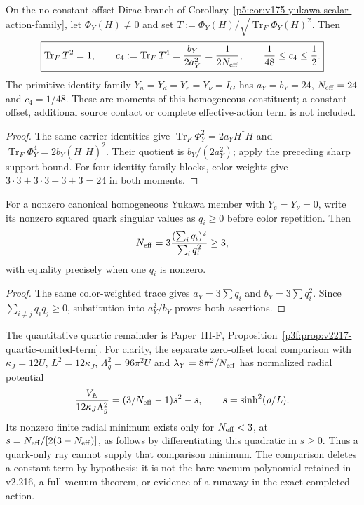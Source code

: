 \documentclass[12pt,a4paper]{article}
\begin{document}
\begin{corollary}
\label{p5:cor:v2211-yukawa-ray-moment}
On the no-constant-offset Dirac branch of
Corollary~\ref{p5:cor:v175-yukawa-scalar-action-family}, let
\(\Phi_Y(H)\ne0\) and set
\(T:=\Phi_Y(H)/\sqrt{\operatorname{Tr}_F\Phi_Y(H)^2}\).
Then
\[
 \boxed{\operatorname{Tr}_FT^2=1,\qquad
 c_4:=\operatorname{Tr}_FT^4
 =\frac{b_Y}{2a_Y^2}=\frac1{2N_{\rm eff}},\qquad
 \frac1{48}\le c_4\le\frac12.}
\]
The primitive identity family \(Y_u=Y_d=Y_e=Y_\nu=I_G\) has
\(a_Y=b_Y=24\), \(N_{\rm eff}=24\) and \(c_4=1/48\).
These are moments of this homogeneous constituent; a constant offset,
additional source contact or complete effective-action term is not included.
\end{corollary}
\begin{proof}
The same-carrier identities give
\(\operatorname{Tr}_F\Phi_Y^2=2a_YH^\dagger H\) and
\(\operatorname{Tr}_F\Phi_Y^4=2b_Y(H^\dagger H)^2\).
Their quotient is \(b_Y/(2a_Y^2)\); apply the preceding sharp support
bound.  For four identity family blocks, color weights give
\(3\cdot3+3\cdot3+3+3=24\) in both moments.
\end{proof}

\begin{corollary}
\label{p5:cor:v2217-color-participation}
For a nonzero canonical homogeneous Yukawa member with $Y_e=Y_\nu=0$,
write its nonzero squared quark singular values as $q_i\ge0$ before color
repetition. Then
\[
 N_{\rm eff}=3\frac{(\sum_iq_i)^2}{\sum_iq_i^2}\ge3,
\]
with equality precisely when one $q_i$ is nonzero.
\end{corollary}
\begin{proof}
The same color-weighted trace gives $a_Y=3\sum q_i$ and
$b_Y=3\sum q_i^2$. Since $\sum_{i\ne j}q_iq_j\ge0$, substitution into
$a_Y^2/b_Y$ proves both assertions.
\end{proof}
The quantitative quartic remainder is
Paper~III-F, Proposition~\ref{p3f:prop:v2217-quartic-omitted-term}.
For clarity, the separate zero-offset local comparison with
$\kappa_J=12U$, $L^2=12\kappa_J$, $\Lambda_g^2=96\pi^2U$ and
$\lambda_Y=8\pi^2/N_{\rm eff}$ has normalized radial potential
\[
 \frac{V_E}{12\kappa_J\Lambda_g^2}
   =(3/N_{\rm eff}-1)s^2-s,\qquad s=\sinh^2(\rho/L).
\]
Its nonzero finite radial minimum exists only for $N_{\rm eff}<3$,
at $s=N_{\rm eff}/[2(3-N_{\rm eff})]$, as follows by differentiating
this quadratic in $s\ge0$. Thus a quark-only ray cannot supply that
comparison minimum. The comparison deletes a constant term by hypothesis;
it is not the bare-vacuum polynomial retained in v2.216, a full vacuum
theorem, or evidence of a runaway in the exact completed action.
\end{document}
